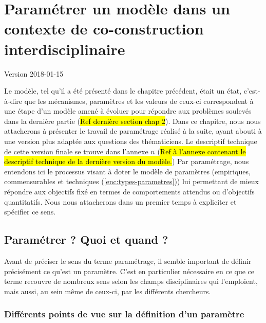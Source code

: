 \documentclass[12pt, a4paper, oneside]{book}
\begin{document}
	\setcounter{part}{0}
	\setcounter{chapter}{2}
	
	
	\chapter{Paramétrer un modèle dans un contexte de co-construction interdisciplinaire}
	\begin{center}
		{\large Version 2018-01-15}
	\end{center}
	
	Le modèle, tel qu'il a été présenté dans le chapitre précédent, était un \og état\fg{}, c'est-à-dire que les mécanismes, paramètres et les valeurs de ceux-ci correspondent à une étape d'un modèle amené à évoluer pour répondre aux problèmes soulevés dans la dernière partie (\hl{Ref dernière section chap 2}).
	Dans ce chapitre, nous nous attacherons à présenter le travail de paramétrage réalisé à la suite, ayant abouti à une version plus adaptée aux questions des thématiciens. Le descriptif technique de cette version \og finale\fg{} se trouve dans l'annexe $n$ (\hl{Ref à l'annexe contenant le descriptif technique de la dernière version du modèle.})
	Par paramétrage, nous entendons ici le processus visant à doter le modèle de paramètres (empiriques, \og commensurables\fg{} et techniques (\ref{enc:types-parametres})) lui permettant de mieux répondre aux objectifs fixé en termes de comportements attendus ou d'objectifs quantitatifs. Nous nous attacherons dans un premier temps à expliciter et spécifier ce sens.
	
	\section{Paramétrer ? Quoi et quand ?}
	
	Avant de préciser le sens du terme \og paramétrage\fg{}, il semble important de définir précisément ce qu'est un paramètre. C'est en particulier nécessaire en ce que ce terme recouvre de nombreux sens selon les champs disciplinaires qui l'emploient, mais aussi, au sein même de ceux-ci, par les différents chercheurs.
	
	\subsection{Différents points de vue sur la définition d'un paramètre}
	
\end{document}
